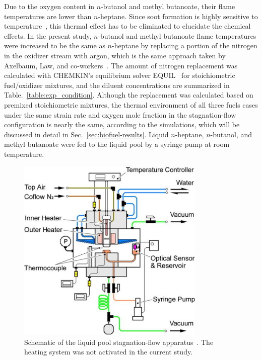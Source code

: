 Due to the oxygen content in $n$-butanol and methyl butanoate, their flame temperatures are lower than $n$-heptane. Since soot formation is highly sensitive to temperature~\cite{wang11}, this thermal effect has to be eliminated to elucidate the chemical effects. In the present study, $n$-butanol and methyl butanoate flame temperatures were increased to be the same as $n$-heptane by replacing a portion of the nitrogen in the oxidizer stream with argon, which is the same approach taken by Axelbaum, Law, and co-workers~\cite{du89,du91,axelbaum91}. The amount of nitrogen replacement was calculated with CHEMKIN's equilibrium solver EQUIL~\cite{chemkin} for stoichiometric fuel/oxidizer mixtures, and the diluent concentrations are summarized in Table.~\ref{table:exp_condition}.  Although the replacement was calculated based on premixed stoichiometric mixtures, the thermal environment of all three fuels cases under the same strain rate and oxygen mole fraction in the stagnation-flow configuration is nearly the same, according to the simulations, which will be discussed in detail in Sec.~\ref{sec:biofuel-results}.  Liquid $n$-heptane, $n$-butanol, and methyl butanoate were fed to the liquid pool by a syringe pump at room temperature.

\begin{figure}[t]
  \centering
  \scriptsize
  \includegraphics[width=0.8\textwidth]{ch-biofuel/Setup.png}
  \normalsize
  \caption{Schematic of the liquid pool stagnation-flow apparatus~\cite{liu10}.  The heating system was not activated in the current study.}
  \label{fig:setup}
\end{figure}

